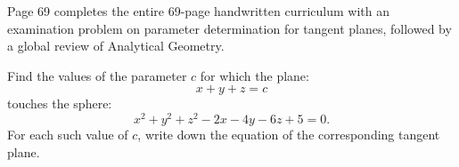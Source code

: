 \begin{conceptbox}
Page 69 completes the entire 69-page handwritten curriculum with an examination problem on parameter determination for tangent planes, followed by a global review of Analytical Geometry.
\end{conceptbox}

\begin{examplebox}
Find the values of the parameter $c$ for which the plane:
\begin{equation}
    x + y + z = c
\end{equation}
touches the sphere:
\begin{equation}
    x^2 + y^2 + z^2 - 2x - 4y - 6z + 5 = 0.
\end{equation}
For each such value of $c$, write down the equation of the corresponding tangent plane.
\end{examplebox}

